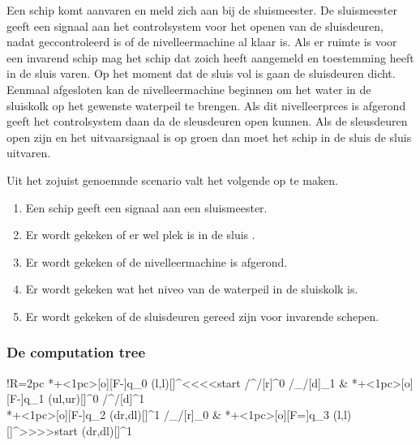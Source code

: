 Een schip komt aanvaren en meld zich aan bij de sluismeester. De sluismeester geeft een signaal aan het controlsystem voor het openen van de sluisdeuren, nadat geccontroleerd is of de nivelleermachine al klaar is. Als er ruimte is voor een invarend schip mag het schip dat zoich heeft aangemeld en toestemming heeft  in de sluis varen. Op het moment dat de sluis vol is gaan de sluisdeuren dicht. Eenmaal afgesloten kan de nivelleermachine beginnen om het water in de sluiskolk op het gewenste waterpeil te brengen. Als dit nivelleerprces is afgerond geeft  het controlsystem daan da de sleusdeuren open kunnen.  Als de sleusdeuren open zijn en het uitvaarsignaal is op groen dan moet het schip in de sluis de sluis uitvaren.

Uit het zojuist genoemnde scenario valt het volgende op te maken.
\begin{enumerate}
	\item Een schip geeft een signaal aan een sluismeester.
	\item Er wordt gekeken of er wel plek is in de sluis .
	\item Er wordt gekeken of de nivelleermachine is afgerond.
	\item Er wordt gekeken wat het niveo van de waterpeil in de sluiskolk is.
	\item Er wordt gekeken of de sluisdeuren gereed zijn voor invarende schepen.
\end{enumerate}



	\subsubsection{De computation tree}

\xymatrix@ur@!R=2pc{%
	*+<1pc>[o][F-]{q_0}  \ar@(l,l)[]^<<<<{start} \ar@/^/[r]^0  \ar@/_/[d]_1 
	& *+<1pc>[o][F-]{q_1} \ar@(ul,ur)[]^{0}  \ar@/^/[d]^1 \\
	*+<1pc>[o][F-]{q_2} \ar@(dr,dl)[]^{1} \ar@/_/[r]_0 
	& *+<1pc>[o][F=]{q_3} \ar@(l,l)[]^>>>>{start}  \ar@(dr,dl)[]^{1} \\

 }










